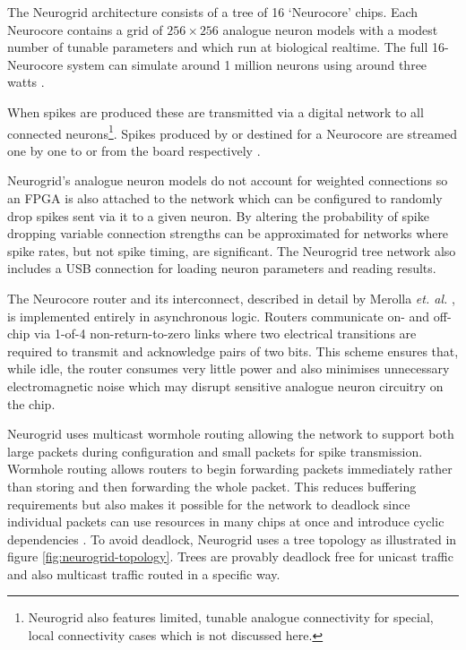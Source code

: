 				The Neurogrid architecture consists of a tree of 16 `Neurocore' chips.
				Each Neurocore contains a grid of $256 \times 256$ analogue neuron
				models with a modest number of tunable parameters and which run at
				biological realtime. The full 16-Neurocore system can simulate around 1
				million neurons using around three watts \cite{benjamin14}.
				
				When spikes are produced these are transmitted via a digital network to
				all connected neurons\footnote{Neurogrid also features limited, tunable
				analogue connectivity for special, local connectivity cases which is not
				discussed here.}. Spikes produced by or destined for a Neurocore are
				streamed one by one to or from the board respectively
				\cite{boahen04,boahen04receiver}.
				
				Neurogrid's analogue neuron models do not account for weighted
				connections so an FPGA is also attached to the network which can be
				configured to randomly drop spikes sent via it to a given neuron. By
				altering the probability of spike dropping variable connection strengths
				can be approximated for networks where spike rates, but not spike
				timing, are significant. The Neurogrid tree network also includes a USB
				connection for loading neuron parameters and reading results. 
				
				The Neurocore router and its interconnect, described in detail by
				Merolla \emph{et. al.} \cite{merolla14}, is implemented entirely in
				asynchronous logic. Routers communicate on- and off-chip via 1-of-4
				non-return-to-zero links where two electrical transitions are
				required to transmit and acknowledge pairs of two bits. This scheme
				ensures that, while idle, the router consumes very little power and also
				minimises unnecessary electromagnetic noise which may disrupt sensitive
				analogue neuron circuitry on the chip.
				
				Neurogrid uses multicast wormhole routing allowing the network to
				support both large packets during configuration and small packets for
				spike transmission. Wormhole routing allows routers to begin forwarding
				packets immediately rather than storing and then forwarding the whole
				packet. This reduces buffering requirements but also makes it possible
				for the network to deadlock since individual packets can use resources
				in many chips at once and introduce cyclic dependencies \cite{dally04}.
				To avoid deadlock, Neurogrid uses a tree topology as illustrated in
				figure \ref{fig:neurogrid-topology}.  Trees are provably deadlock free
				for unicast traffic and also multicast traffic routed in a specific way.
				
